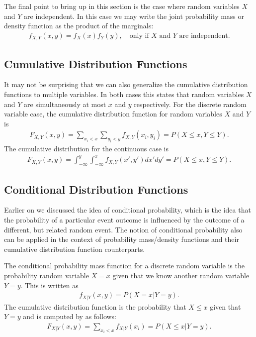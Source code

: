 The final point to bring up in this section is the case where random variables $X$ and $Y$ are independent. In this case we may write the joint probability mass or density function as the product of the marginals:
\begin{align}
  f_{X,Y}(x,y) = f_X(x) f_Y(y), \quad \text{only if $X$ and $Y$ are independent.}
\end{align}

\subsection{Cumulative Distribution Functions}

It may not be surprising that we can also generalize the cumulative distribution functions to multiple variables. In both cases this states that random variables $X$ and $Y$ are simultaneously at most $x$ and $y$ respectively. For the discrete random variable case, the cumulative distribution function for random variables $X$ and $Y$ is
\begin{align}
  F_{X,Y}(x,y) = \sum_{x_i < x} \sum_{y_i < y} f_{X,Y}(x_i,y_i) = P( X \le x, Y \le Y ).
\end{align}
The cumulative distribution for the continuous case is
\begin{align}
  F_{X,Y}(x,y) = \int_{-\infty}^y \int_{-\infty}^x f_{X,Y}(x',y') dx' dy' = P( X \le x, Y \le Y ).
\end{align}


\subsection{Conditional Distribution Functions}

Earlier on we discussed the idea of conditional probability, which is the idea that the probability of a particular event outcome is influenced by the outcome of a different, but related random event. The notion of conditional probability also can be applied in the context of probability mass/density functions and their cumulative distribution function counterparts. 

The conditional probability mass function for a discrete random variable is the probability random variable $X = x$ given that we know another random variable $Y = y$. This is written as
\begin{align}
  f_{X|Y}(x,y) = P( X = x | Y = y ) .
\end{align}
The cumulative distribution function is the probability that $X \le x$ given that $Y = y$ and is computed by as follows:
\begin{align}
  F_{X|Y}(x,y) = \sum_{x_i < x} f_{X|Y}(x_i) = P( X \le x | Y = y ) .
\end{align}

